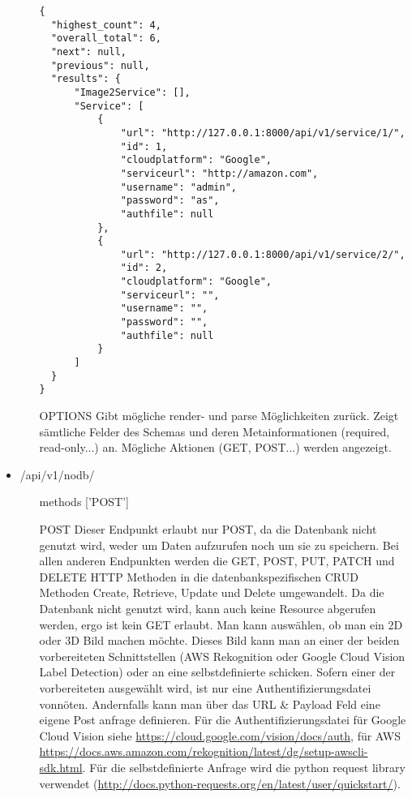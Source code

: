 \begin{itemize}[align=parleft, labelsep=2cm, label={}, leftmargin=1cm]
\begin{enumerate}[align=parleft, labelsep=*, leftmargin=*]
\begin{verbatim}
{
  "highest_count": 4,
  "overall_total": 6,
  "next": null,
  "previous": null,
  "results": {
      "Image2Service": [],
      "Service": [
          {
              "url": "http://127.0.0.1:8000/api/v1/service/1/",
              "id": 1,
              "cloudplatform": "Google",
              "serviceurl": "http://amazon.com",
              "username": "admin",
              "password": "as",
              "authfile": null
          },
          {
              "url": "http://127.0.0.1:8000/api/v1/service/2/",
              "id": 2,
              "cloudplatform": "Google",
              "serviceurl": "",
              "username": "",
              "password": "",
              "authfile": null
          }
      ]
  }
}
        \end{verbatim}
        \item[OPTIONS] Gibt mögliche render- und parse Möglichkeiten zurück. Zeigt sämtliche Felder des Schemas und deren Metainformationen (required, read-only...) an. Mögliche Aktionen (GET, POST...) werden angezeigt.


	\end{enumerate}
        \item \textcolor{mypink1}{/api/v1/nodb/} 
	\begin{enumerate}[align=parleft, labelsep=*, leftmargin=*]
		\item[methods] ['POST']
        \item[POST] Dieser Endpunkt erlaubt nur POST, da die Datenbank nicht genutzt wird, weder um Daten aufzurufen noch um sie zu speichern. Bei allen anderen Endpunkten werden die GET, POST, PUT, PATCH und DELETE HTTP Methoden in die datenbankspezifischen CRUD Methoden Create, Retrieve, Update und Delete umgewandelt. Da die Datenbank nicht genutzt wird, kann auch keine Resource abgerufen werden, ergo ist kein GET erlaubt. Man kann auswählen, ob man ein 2D oder 3D Bild machen möchte. Dieses Bild kann man an einer der beiden vorbereiteten Schnittstellen (AWS Rekognition oder Google Cloud Vision Label Detection) oder an eine selbstdefinierte schicken. Sofern einer der vorbereiteten ausgewählt wird, ist nur eine Authentifizierungsdatei vonnöten. Andernfalls kann man über das URL \& Payload Feld eine eigene Post anfrage definieren. Für die Authentifizierungsdatei für Google Cloud Vision siehe \url{https://cloud.google.com/vision/docs/auth}, für AWS \url{https://docs.aws.amazon.com/rekognition/latest/dg/setup-awscli-sdk.html}. Für die selbstdefinierte Anfrage wird die python request library verwendet (\url{http://docs.python-requests.org/en/latest/user/quickstart/}).
    \end{enumerate}
\end{itemize}
